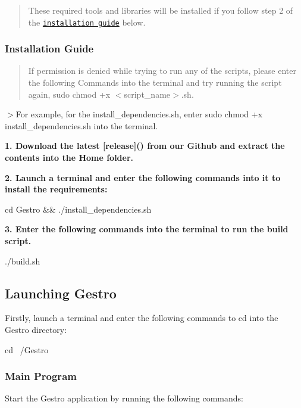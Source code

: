 \begin{quote}
These required tools and libraries will be installed if you follow step 2 of the \href{#installation-guide}{\tt installation guide} below. \end{quote}


\subsubsection*{Installation Guide}

\begin{quote}
If permission is denied while trying to run any of the scripts, please enter the following Commands into the terminal and try running the script again, {\ttfamily sudo chmod +x $<$script\+\_\+name$>$.sh}. \end{quote}


$>$For example, for the install\+\_\+dependencies.\+sh, enter {\ttfamily sudo chmod +x install\+\_\+dependencies.\+sh} into the terminal.

{\bfseries 1. Download the latest \mbox{[}release\mbox{]}() from our Github and extract the contents into the Home folder.}

{\bfseries 2. Launch a terminal and enter the following commands into it to install the requirements\+:} 
\begin{DoxyCode}
cd Gestro && ./install\_dependencies.sh
\end{DoxyCode}


{\bfseries 3. Enter the following commands into the terminal to run the build script.} 
\begin{DoxyCode}
./build.sh
\end{DoxyCode}


\subsection*{Launching Gestro}

Firstly, launch a terminal and enter the following commands to cd into the Gestro directory\+: 
\begin{DoxyCode}
cd ~/Gestro
\end{DoxyCode}


\subsubsection*{Main Program}

Start the Gestro application by running the following commands\+:



